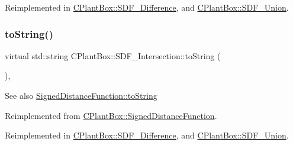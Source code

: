 Reimplemented in \hyperlink{classCPlantBox_1_1SDF__Difference_a3026bc983827af9842f32b1f72808ac1}{C\+Plant\+Box\+::\+S\+D\+F\+\_\+\+Difference}, and \hyperlink{classCPlantBox_1_1SDF__Union_a8da2dd137f1676b7bd66cdcc9c8bef00}{C\+Plant\+Box\+::\+S\+D\+F\+\_\+\+Union}.

\mbox{\label{classCPlantBox_1_1SDF__Intersection_ae095150852cdaedec026b4dea1f87c40}} 
\subsubsection{\texorpdfstring{to\+String()}{toString()}}
{\footnotesize\ttfamily virtual std\+::string C\+Plant\+Box\+::\+S\+D\+F\+\_\+\+Intersection\+::to\+String (\begin{DoxyParamCaption}{ }\end{DoxyParamCaption})\hspace{0.3cm}{\ttfamily [inline]}, {\ttfamily [virtual]}}

\begin{DoxySeeAlso}{See also}
\hyperlink{classCPlantBox_1_1SignedDistanceFunction_a9f375961d9a24b06dc669ac67aa16fa6}{Signed\+Distance\+Function\+::to\+String} 
\end{DoxySeeAlso}


Reimplemented from \hyperlink{classCPlantBox_1_1SignedDistanceFunction_a9f375961d9a24b06dc669ac67aa16fa6}{C\+Plant\+Box\+::\+Signed\+Distance\+Function}.



Reimplemented in \hyperlink{classCPlantBox_1_1SDF__Difference_a63fc8597ea841a973ab29d7aa6cea3ca}{C\+Plant\+Box\+::\+S\+D\+F\+\_\+\+Difference}, and \hyperlink{classCPlantBox_1_1SDF__Union_ae73d167fbe4edc64b4f41d2e820a0517}{C\+Plant\+Box\+::\+S\+D\+F\+\_\+\+Union}.

\mbox{\label{classCPlantBox_1_1SDF__Intersection_ad7d4972e0a71113d93c357eddac9ae99}} 
